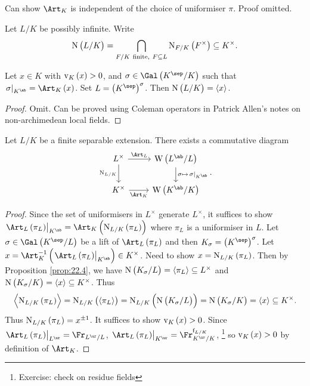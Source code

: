 \begin{remark*}
Can show $ \Art_K $ is independent of the choice of uniformiser $ \pi $. Proof omitted.
\end{remark*}

\begin{notation*}
Let $ L / K $ be possibly infinite. Write
$$ \N\br{L / K} = \bigcap_{F / K \ \text{finite}, \ F \subseteq L} \N_{F / K}\br{F^\times} \subseteq K^\times. $$
\end{notation*}

\begin{proposition}
\label{prop:22.4}
Let $ x \in K $ with $ \v_K\br{x} > 0 $, and $ \sigma \in \Gal\br{K^{\sep} / K} $ such that $ \eval{\sigma}_{K^{\ab}} = \Art_K\br{x} $. Set $ L = \br{K^{\sep}}^\sigma $. Then $ \N\br{L / K} = \abr{x} $.
\end{proposition}

\begin{proof}
Omit. Can be proved using Coleman operators in Patrick Allen's notes on non-archimedean local fields.
\end{proof}

\pagebreak

\begin{theorem}
\label{thm:22.5}
Let $ L / K $ be a finite separable extension. There exists a commutative diagram
$$
\begin{tikzcd}
L^\times \arrow{r}{\Art_L} \arrow{d}[swap]{\N_{L / K}} & \W\br{L^{\ab} / L} \arrow{d}{\sigma \mapsto \eval{\sigma}_{K^{\ab}}} \\
K^\times \arrow{r}[swap]{\Art_K} & \W\br{K^{\ab} / K}
\end{tikzcd}.
$$
\end{theorem}

\begin{proof}
Since the set of uniformisers in $ L^\times $ generate $ L^\times $, it suffices to show $ \eval{\Art_L\br{\pi_L}}_{K^{\ab}} = \Art_K\br{\N_{L / K}\br{\pi_L}} $ where $ \pi_L $ is a uniformiser in $ L $. Let $ \sigma \in \Gal\br{K^{\sep} / L} $ be a lift of $ \Art_L\br{\pi_L} $ and then $ K_\sigma = \br{K^{\sep}}^\sigma $. Let $ x = \Art_K^{-1}\br{\eval{\Art_L\br{\pi_L}}_{K^{\ab}}} \in K^\times $. Need to show $ x = \N_{L / K}\br{\pi_L} $. Then by Proposition \ref{prop:22.4}, we have $ \N\br{K_\sigma / L} = \abr{\pi_L} \subseteq L^\times $ and $ \N\br{K_\sigma / K} = \abr{x} \subseteq K^\times $. Thus
$$ \abr{\N_{L / K}\br{\pi_L}} = \N_{L / K}\br{\abr{\pi_L}} = \N_{L / K}\br{\N\br{K_\sigma / L}} = \N\br{K_\sigma / K} = \abr{x} \subseteq K^\times. $$
Thus $ \N_{L / K}\br{\pi_L} = x^{\pm 1} $. It suffices to show $ \v_K\br{x} > 0 $. Since $ \eval{\Art_L\br{\pi_L}}_{L^{\ur}} = \Fr_{L^{\ur} / L} $, $ \eval{\Art_L\br{\pi_L}}_{K^{\ur}} = \Fr_{K^{\ur} / K}^{\f_{L / K}} $, \footnote{Exercise: check on residue fields} so $ \v_K\br{x} > 0 $ by definition of $ \Art_K $.
\end{proof}

